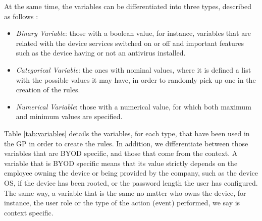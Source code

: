\documentclass[a4paper,10pt,twocolumn,preprint,3p]{elsarticle}
\begin{document}
At the same time, the variables can be differentiated into three types, described as follows \cite{witten2005data}:

\begin{itemize}
\item {\em Binary Variable}: those with a boolean value, for instance, variables that are related with the device services switched on or off and important features such as the device having or not an antivirus installed. 
\item {\em Categorical Variable}: the ones with nominal values, where it is defined a list with the possible values it may have, in order to randomly pick up one in the creation of the rules. 
\item {\em Numerical Variable}: those with a numerical value, for which both maximum and minimum values are specified. 

\end{itemize}

Table \ref{tab:variables} details the variables, for each type, that have been used in the GP in order to create the rules. In addition, we differentiate between those variables that are BYOD specific, and those that come from the context. A variable that is BYOD specific means that its value strictly depends on the employee owning the device or being provided by the company, such as the device OS, if the device has been rooted, or the password length the user has configured. The same way, a variable that is the same no matter who owns the device, for instance, the user role or the type of the action (event) performed, we say is context specific.
\end{document}
